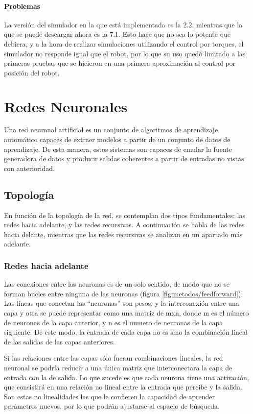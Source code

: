 \paragraph{Problemas}
La versión del simulador en la que está implementada es la 2.2, mientras que la que se puede descargar ahora es la 7.1. Esto hace que no sea lo potente que debiera, y a la hora de realizar simulaciones utilizando el control por torques, el simulador no responde igual que el robot, por lo que su uso quedó limitado a las primeras pruebas que se hicieron en una primera aproximación al control por posición del robot.

\section{Redes Neuronales}
Una red neuronal artificial \cite{abu2012learning} \cite{hinton} \cite{andrewng} es un conjunto de algoritmos de aprendizaje automático capaces de extraer modelos a partir de un conjunto de datos de aprendizaje. De esta manera, estos sistemas son capaces de emular la fuente generadora de datos y producir salidas coherentes a partir de entradas no vistas con anterioridad.
\subsection{Topología}
En función de la topología de la red, se contemplan dos tipos fundamentales: las redes hacia adelante, y las redes recursivas. A continuación se habla de las redes hacia delante, mientras que las redes recursivas se analizan en un apartado más adelante.
\subsubsection{Redes hacia adelante}
Las conexiones entre las neuronas es de un solo sentido, de modo que no se forman bucles entre ninguna de las neuronas (figura \ref{fig:metodos/feedforward}). Las líneas que conectan las ``neuronas'' son pesos, y la interconexión entre una capa y otra se puede representar como una matriz de mxn, donde m es el número de neuronas de la capa anterior, y n es el numero de neuronas de la capa siguiente. De este modo, la entrada de cada capa no es sino la combinación lineal de las salidas de las capas anteriores.

Si las relaciones entre las capas sólo fueran combinaciones lineales, la red neuronal se podría reducir a una única matriz que interconectara la capa de entrada con la de salida. Lo que sucede es que cada neurona tiene una activación, que consistirá en una relación no lineal entre la entrada que percibe y la salida. Son estas no linealidades las que le confieren la capacidad de aprender parámetros nuevos, por lo que podrán ajustarse al espacio de búsqueda.

